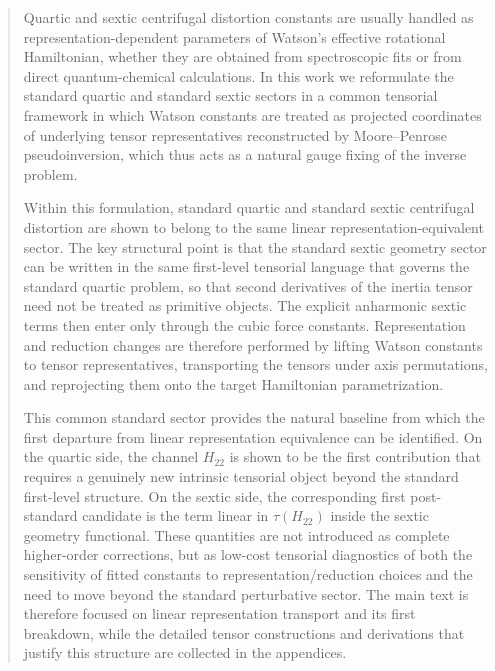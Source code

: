 \begin{abstract}
Quartic and sextic centrifugal distortion constants are usually handled as
representation-dependent parameters of Watson's effective rotational
Hamiltonian, whether they are obtained from spectroscopic fits or from direct
quantum-chemical calculations.  In this work we reformulate the standard
quartic and standard sextic sectors in a common tensorial framework in which
Watson constants are treated as projected coordinates of underlying tensor
representatives reconstructed by Moore--Penrose pseudoinversion, which thus
acts as a natural gauge fixing of the inverse problem.

Within this formulation, standard quartic and standard sextic centrifugal
distortion are shown to belong to the same linear representation-equivalent
sector.  The key structural point is that the standard sextic geometry sector
can be written in the same first-level tensorial language that governs the
standard quartic problem, so that second derivatives of the inertia tensor need
not be treated as primitive objects.  The explicit anharmonic sextic terms then
enter only through the cubic force constants.  Representation and reduction
changes are therefore performed by lifting Watson constants to tensor
representatives, transporting the tensors under axis permutations, and
reprojecting them onto the target Hamiltonian parametrization.

This common standard sector provides the natural baseline from which the first
departure from linear representation equivalence can be identified.  On the
quartic side, the channel $H_{22}$ is shown to be the first contribution that
requires a genuinely new intrinsic tensorial object beyond the standard
first-level structure.  On the sextic side, the corresponding first
post-standard candidate is the term linear in $\tau(H_{22})$ inside the sextic
geometry functional.  These quantities are not introduced as complete
higher-order corrections, but as low-cost tensorial diagnostics of both the
sensitivity of fitted constants to representation/reduction choices and the need
to move beyond the standard perturbative sector.  The main text is therefore
focused on linear representation transport and its first breakdown, while the
detailed tensor constructions and derivations that justify this structure are
collected in the appendices.
\end{abstract}
